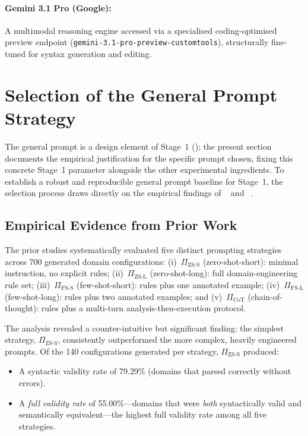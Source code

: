 \paragraph{Gemini 3.1 Pro (Google):}
A multimodal reasoning engine accessed via a specialised coding-optimised preview endpoint (\texttt{gemini-3.1-pro-preview-customtools}), structurally fine-tuned for syntax generation and editing.


\section{Selection of the General Prompt Strategy}
\label{sec:setup:general_prompt}

The general prompt is a design element of Stage~1 (); the present section documents the empirical justification for the specific prompt chosen, fixing this concrete Stage~1 parameter alongside the other experimental ingredients.
To establish a robust and reproducible general prompt baseline for Stage~1, the selection process draws directly on the empirical findings of \citeauthor{Georgievski2025}~\cite{Georgievski2025} and \citeauthor{Elis2025}~\cite{Elis2025}.

\subsection{Empirical Evidence from Prior Work}

The prior studies systematically evaluated five distinct prompting strategies across 700 generated domain configurations:
(i)~$\Pi_\text{ZS-S}$ (zero-shot-short): minimal instruction, no explicit rules;
(ii)~$\Pi_\text{ZS-L}$ (zero-shot-long): full domain-engineering rule set;
(iii)~$\Pi_\text{FS-S}$ (few-shot-short): rules plus one annotated example;
(iv)~$\Pi_\text{FS-L}$ (few-shot-long): rules plus two annotated examples; and
(v)~$\Pi_\text{CoT}$ (chain-of-thought): rules plus a multi-turn analysis-then-execution protocol.

The analysis revealed a counter-intuitive but significant finding: the simplest strategy, $\Pi_\text{ZS-S}$, consistently outperformed the more complex, heavily engineered prompts.
Of the 140 configurations generated per strategy, $\Pi_\text{ZS-S}$ produced:
\begin{itemize}
  \item A syntactic validity rate of 79.29\% (domains that parsed correctly without errors).
  \item A \emph{full validity rate} of 55.00\%---domains that were \emph{both} syntactically valid and semantically equivalent---the highest full validity rate among all five strategies.
\end{itemize}

